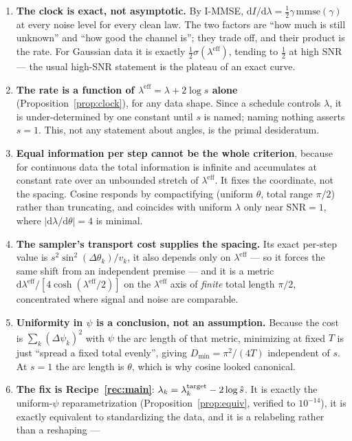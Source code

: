 \documentclass[11pt]{article}
\theoremstyle{definition}
\newcommand{\snr}{\mathrm{SNR}}
\newcommand{\dd}{\mathrm{d}}
\newcommand{\mmse}{\mathrm{mmse}}
\newcommand{\leff}{\lambda^{\mathrm{eff}}}
\begin{document}
\begin{enumerate}\itemsep3pt
  \item \textbf{The clock is exact, not asymptotic.} By I-MMSE,
  $\dd I/\dd\lambda=\tfrac12\gamma\,\mmse(\gamma)$ at every noise level for every
  clean law. The two factors are ``how much is still unknown'' and ``how good the
  channel is''; they trade off, and their product is the rate. For Gaussian data
  it is exactly $\tfrac12\sigma(\leff)$, tending to $\tfrac12$ at high SNR --- the
  usual high-SNR statement is the plateau of an exact curve.
  \item \textbf{The rate is a function of $\leff=\lambda+2\log s$ alone}
  (Proposition~\ref{prop:clock}), for any data shape. Since a schedule controls
  $\lambda$, it is under-determined by one constant until $s$ is named; naming
  nothing asserts $s=1$. This, not any statement about angles, is the primal
  desideratum.
  \item \textbf{Equal information per step cannot be the whole criterion}, because
  for continuous data the total information is infinite and accumulates at
  constant rate over an unbounded stretch of $\leff$. It fixes the coordinate, not
  the spacing. Cosine responds by compactifying (uniform $\theta$, total range
  $\pi/2$) rather than truncating, and coincides with uniform $\lambda$ only near
  $\snr=1$, where $|\dd\lambda/\dd\theta|=4$ is minimal.
  \item \textbf{The sampler's transport cost supplies the spacing.} Its exact
  per-step value is $s^2\sin^2(\Delta\theta_k)/v_k$, it also depends only on
  $\leff$ --- so it forces the same shift from an independent premise --- and it is
  a metric $\dd\leff/[4\cosh(\leff/2)]$ on the $\leff$ axis of \emph{finite} total
  length $\pi/2$, concentrated where signal and noise are comparable.
  \item \textbf{Uniformity in $\psi$ is a conclusion, not an assumption.} Because
  the cost is $\sum_k(\Delta\psi_k)^2$ with $\psi$ the arc length of that metric,
  minimizing at fixed $T$ is just ``spread a fixed total evenly'', giving
  $D_{\min}=\pi^2/(4T)$ independent of $s$. At $s=1$ the arc length is $\theta$,
  which is why cosine looked canonical.
  \item \textbf{The fix is Recipe~\ref{rec:main}}: $\lambda_k=\lambda^{\rm
  target}_k-2\log\hat s$. It is exactly the uniform-$\psi$ reparametrization
  (Proposition~\ref{prop:equiv}, verified to $10^{-14}$), it is exactly equivalent
  to standardizing the data, and it is a relabeling rather than a reshaping ---

\end{enumerate}
\end{document}
